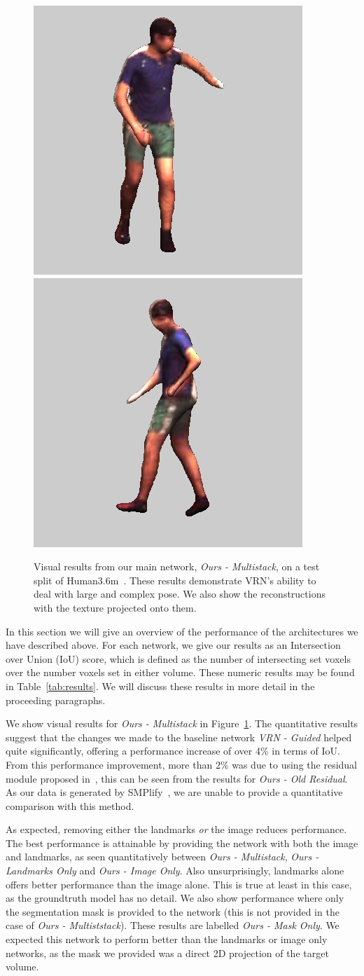 \begin{figure}
\includegraphics[width=0.2\linewidth]{img/results/multistack-textured/S11WalkTogether_1_60457274_mp4_frame00026__max200_pad25_jpg.png}
\includegraphics[width=0.2\linewidth]{img/results/multistack-textured/S11WalkTogether_1_60457274_mp4_frame00031__max200_pad25_jpg.png}
\caption{Visual results from our main network, \textit{Ours -
    Multistack}, on a test split of Human3.6m~\cite{h36m_pami}. These
  results demonstrate VRN's ability to deal with large and complex
  pose. We also show the reconstructions with the texture projected
  onto them.}
\label{fig:visres_ours}
\end{figure}


In this section we will give an overview of the performance of the
architectures we have described above. For each network, we give our
results as an Intersection over Union (IoU) score, which is defined as
the number of intersecting set voxels over the number voxels set in
either volume. These numeric results may be found in
Table~\ref{tab:results}. We will discuss these results in more detail
in the proceeding paragraphs.

We show visual results for \textit{Ours - Multistack} in
Figure~\ref{fig:visres_ours}. The quantitative results suggest that
the changes we made to the baseline network \textit{VRN - Guided}
helped quite significantly, offering a performance increase of over
4\% in terms of IoU. From this performance improvement, more than 2\%
was due to using the residual module proposed
in~\cite{bulat2017binarized}, this can be seen from the results for
\textit{Ours - Old Residual}. As our data is generated by
SMPlify~\cite{bogo2016smplify}, we are unable to provide a
quantitative comparison with this method.

As expected, removing either the landmarks \textit{or} the image
reduces performance. The best performance is attainable by providing
the network with both the image and landmarks, as seen quantitatively
between \textit{Ours - Multistack}, \textit{Ours - Landmarks Only} and
\textit{Ours - Image Only}. Also unsurprisingly, landmarks alone
offers better performance than the image alone. This is true at least
in this case, as the groundtruth model has no detail. We also show
performance where only the segmentation mask is provided to the
network (this is not provided in the case of \textit{Ours -
  Multiststack}). These results are labelled \textit{Ours - Mask
  Only}. We expected this network to perform better than the landmarks
or image only networks, as the mask we provided was a direct 2D
projection of the target volume.


